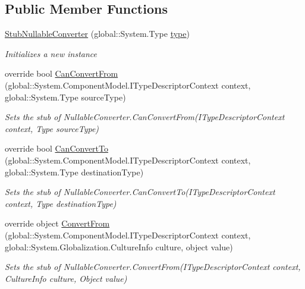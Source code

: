 \subsection*{Public Member Functions}
\begin{DoxyCompactItemize}
\item 
\hyperlink{class_system_1_1_component_model_1_1_fakes_1_1_stub_nullable_converter_ac1fef1846ead6480ea59d7aa20d65140}{Stub\-Nullable\-Converter} (global\-::\-System.\-Type \hyperlink{jquery-1_810_82-vsdoc_8js_a3940565e83a9bfd10d95ffd27536da91}{type})
\begin{DoxyCompactList}\small\item\em Initializes a new instance\end{DoxyCompactList}\item 
override bool \hyperlink{class_system_1_1_component_model_1_1_fakes_1_1_stub_nullable_converter_af7b804cac9755a445b64e157e53aa0ef}{Can\-Convert\-From} (global\-::\-System.\-Component\-Model.\-I\-Type\-Descriptor\-Context context, global\-::\-System.\-Type source\-Type)
\begin{DoxyCompactList}\small\item\em Sets the stub of Nullable\-Converter.\-Can\-Convert\-From(\-I\-Type\-Descriptor\-Context context, Type source\-Type)\end{DoxyCompactList}\item 
override bool \hyperlink{class_system_1_1_component_model_1_1_fakes_1_1_stub_nullable_converter_a959ed9467d5815052c2f26d8856a73b6}{Can\-Convert\-To} (global\-::\-System.\-Component\-Model.\-I\-Type\-Descriptor\-Context context, global\-::\-System.\-Type destination\-Type)
\begin{DoxyCompactList}\small\item\em Sets the stub of Nullable\-Converter.\-Can\-Convert\-To(\-I\-Type\-Descriptor\-Context context, Type destination\-Type)\end{DoxyCompactList}\item 
override object \hyperlink{class_system_1_1_component_model_1_1_fakes_1_1_stub_nullable_converter_ad0dcb4a5467ed26d9ab1841dfe364836}{Convert\-From} (global\-::\-System.\-Component\-Model.\-I\-Type\-Descriptor\-Context context, global\-::\-System.\-Globalization.\-Culture\-Info culture, object value)
\begin{DoxyCompactList}\small\item\em Sets the stub of Nullable\-Converter.\-Convert\-From(\-I\-Type\-Descriptor\-Context context, Culture\-Info culture, Object value)\end{DoxyCompactList}\item 

\end{DoxyCompactItemize}
